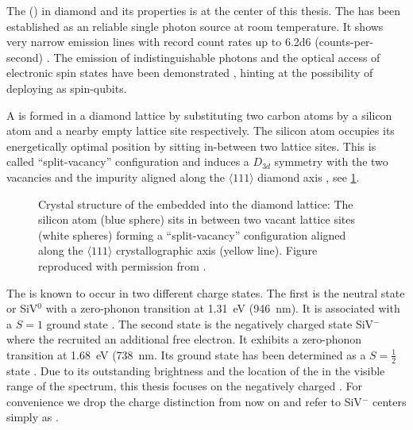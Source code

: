   The \sivc (\siv) in diamond and its properties is at the center of this thesis. The \siv has been established as an reliable single photon source at room temperature. It shows very narrow emission lines with record count rates up to \SI{6.2d6}{\cps} (counts-per-second) \cite{Neu2012a}. The emission of indistinguishable photons and the optical access of electronic spin states have been demonstrated \cite{Sipahigil2014, Mueller2014, Pingault2014, Rogers2014a}, hinting at the possibility of deploying \sivs as spin-qubits.

  A \sivc is formed in a diamond lattice by substituting two carbon atoms by a silicon atom and a nearby empty lattice site respectively. The silicon atom occupies its energetically optimal position by sitting in-between two lattice sites. This is called ``split-vacancy'' configuration and induces a $D_{3d}$ symmetry with the two vacancies and the impurity aligned along the $\langle 111 \rangle$ diamond axis \cite{janine:222}, see \cref{fig::siv_lattice}.

  \begin{figure}[htbp]
		\centering
		\caption[Split-vacancy configuration for \sivs in diamond]{Crystal structure of the \siv embedded into the diamond lattice: The silicon atom (blue sphere) sits in between two vacant lattice sites (white spheres) forming a ``split-vacancy'' configuration aligned along the $\langle 111 \rangle$ crystallographic axis (yellow line). Figure reproduced with permission from \cite{Riedrich-moller2014}.}
		\label{fig::siv_lattice}
	\end{figure}


  The \siv is known to occur in two different charge states. The first is the neutral state or SiV$^0$ with a zero-phonon transition at \SI{1.31}{\eV} (\SI{946}{\nm}). It is associated with a $S = 1$ ground state \cite{DHaenens-Johansson2011}. The second state is the negatively charged state SiV$^{-}$ where the \sivc recruited an additional free electron. It exhibits a zero-phonon transition at \SI{1.68}{\eV} (\SI{738}{\nm}. Its ground state has been determined as a $S = \frac{1}{2}$ state \cite{Goss2007, Hepp2014}. Due to its outstanding brightness and the location of the \zpl in the visible range of the spectrum, this thesis focuses on the negatively charged \siv. For convenience we drop the charge distinction from now on and refer to SiV$^{-}$ centers simply as \sivs.

